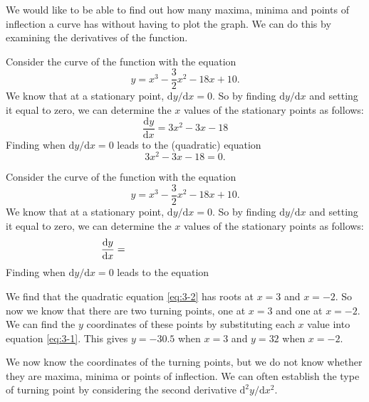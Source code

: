 \documentclass[
  11pt,
  oneside]{book}
\newcommand{\slide}{}
\theoremstyle{definition}
\theoremstyle{definition}
\theoremstyle{definition}
\theoremstyle{definition}
\theoremstyle{remark}
\begin{document}
\slide

We would like to be able to find out how many maxima, minima and points of inflection a curve has without having to plot the graph. We can do this by examining the derivatives of the function.

\begin{notslides}

Consider the curve of the function with the equation
\[
y = x^3-\frac 32x^2-18x+10.
\]
We know that at a stationary point, \(\mathrm{d}y/\mathrm{d} x=0\). So by finding \(\mathrm{d}y/\mathrm{d} x\) and setting it equal to zero, we can determine the \(x\) values of the stationary points as follows:
\begin{equation}
\frac{\mathrm{d} y}{\mathrm{d} x} = 3x^2-3x-18
\label{eq:3-1}
\end{equation}
Finding when \(\mathrm{d}y/\mathrm{d} x = 0\) leads to the (quadratic) equation
\begin{equation}
3x^2-3x-18=0.
\label{eq:3-2}
\end{equation}

\end{notslides}

\begin{slidesonly}

Consider the curve of the function with the equation
\[
y = x^3-\frac 32x^2-18x+10.
\]
We know that at a stationary point, \(\mathrm{d}y/\mathrm{d} x=0\). So by finding \(\mathrm{d}y/\mathrm{d} x\) and setting it equal to zero, we can determine the \(x\) values of the stationary points as follows:
\begin{equation}
\frac{\mathrm{d} y}{\mathrm{d} x} =\hbox to 5cm{}
\label{eq:3-1}
\end{equation}
Finding when \(\mathrm{d}y/\mathrm{d} x = 0\) leads to the equation
\begin{equation}
\label{eq:3-2}
\end{equation}

\end{slidesonly}

\slide

\begin{notslides}

We find that the quadratic equation \eqref{eq:3-2} has roots at \(x = 3\) and \(x = -2\). So now we know that there are two turning points, one at \(x = 3\) and one at \(x = -2\). We can find the \(y\) coordinates of these points by substituting each \(x\) value into equation \eqref{eq:3-1}. This gives \(y = -30.5\) when \(x = 3\) and \(y = 32\) when \(x = -2\).

We now know the coordinates of the turning points, but we do not know whether they are maxima, minima or points of inflection. We can often establish the type of turning point by considering the second derivative \(\mathrm{d}^{2}y/\mathrm{d} x^2\).

\end{notslides}
\end{document}
